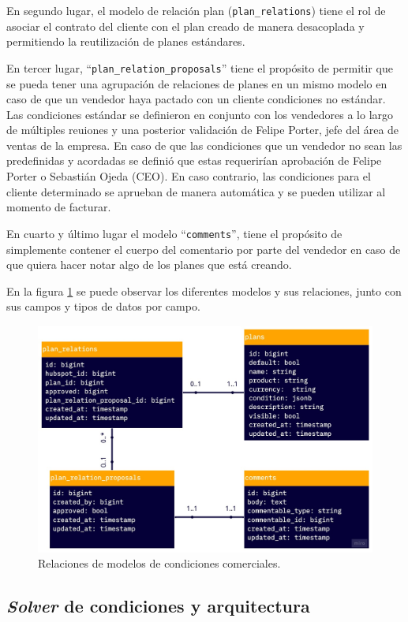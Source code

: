     En segundo lugar, el modelo de relación plan (\texttt{plan\_relations}) tiene el rol de asociar el contrato del cliente con el plan creado de manera desacoplada y permitiendo la reutilización de planes estándares. 
    
    En tercer lugar, ``\texttt{plan\_relation\_proposals}'' tiene el propósito de permitir que se pueda tener una agrupación de relaciones de planes en un mismo modelo en caso de que un vendedor haya pactado con un cliente condiciones no estándar. Las condiciones estándar se definieron en conjunto con los vendedores a lo largo de múltiples reuiones y una posterior validación de Felipe Porter, jefe del área de ventas de la empresa. En caso de que las condiciones que un vendedor no sean las predefinidas y acordadas se definió que estas requerirían aprobación de Felipe Porter o Sebastián Ojeda (CEO). En caso contrario, las condiciones para el cliente determinado se aprueban de manera automática y se pueden utilizar al momento de facturar.
    
    En cuarto y último lugar el modelo ``\texttt{comments}'', tiene el propósito de simplemente contener el cuerpo del comentario por parte del vendedor en caso de que quiera hacer notar algo de los planes que está creando.

    En la figura \ref{fig:cc_relations} se puede observar los diferentes modelos y sus relaciones, junto con sus campos y tipos de datos por campo.
    
    \begin{figure}
      \centering
      \includegraphics[width=0.75\linewidth]{figures/cc/cc_relations.jpg}
      \caption{Relaciones de modelos de condiciones comerciales.}
      \label{fig:cc_relations}
    \end{figure}

  \subsection{\textit{Solver} de condiciones y arquitectura}

